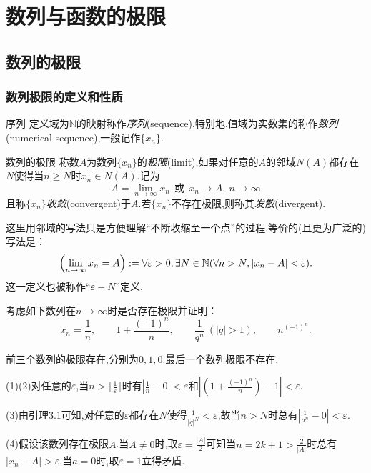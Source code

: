 \chapter{数列与函数的极限}

\section{数列的极限}

\subsection{数列极限的定义和性质}

\begin{definition}{序列}
	定义域为$\mathbb{N}$的映射称作\textit{序列}(sequence).特别地,值域为实数集的称作\textit{数列}(numerical sequence),一般记作$\{ x_n \}$.
\end{definition}

\begin{definition}{数列的极限}
	称数$A$为数列$\{ x_n \}$的\textit{极限}(limit),如果对任意的$A$的邻域$N(A)$都存在$N$使得当$n \geq N$时$x_n \in N(A)$.记为$$A = \lim_{n \to \infty} x_n ~~ \text{或} ~~ x_n \to A,~n \to \infty$$且称$\{ x_n \}$\textit{收敛}(convergent)于$A$.若$\{ x_n \}$不存在极限,则称其\textit{发散}(divergent).
\end{definition}
\begin{remark}
	这里用邻域的写法只是方便理解“不断收缩至一个点”的过程.等价的(且更为广泛的)写法是：$$\left( \lim_{n \to \infty} x_n = A \right) := \forall \varepsilon > 0 , \exists N \in \mathbb{N} (\forall n>N,|x_n-A|<\varepsilon ).$$
	这一定义也被称作“$\varepsilon -N$”定义.
\end{remark}

\begin{example}
	考虑如下数列在$n\to \infty$时是否存在极限并证明：$$x_n=\frac{1}{n},\qquad 1+\frac{(-1)^n}{n},\qquad \frac{1}{q^n}~(|q|>1),\qquad n^{(-1)^n}.$$
\end{example}
\begin{solution}
	前三个数列的极限存在,分别为$0,1,0$.最后一个数列极限不存在.
	
	(1)(2)对任意的$\varepsilon$,当$n>\lfloor \frac{1}{\varepsilon} \rfloor$时有$|\frac{1}{n} -0|<\varepsilon$和$|(1+\frac{(-1)^n}{n})-1|<\varepsilon$.
	
	(3)由引理3.1可知,对任意的$\varepsilon$都存在$N$使得$\frac{1}{|q|^N}<\varepsilon$,故当$n>N$时总有$|\frac{1}{a^n}-0|<\varepsilon$.
	
	(4)假设该数列存在极限$A$.当$A \neq 0$时,取$\varepsilon = \frac{|A|}{2}$可知当$n=2k+1 > \frac{2}{|A|}$时总有$|x_n-A|>\varepsilon$.当$a=0$时,取$\varepsilon =1$立得矛盾.
\end{solution}

